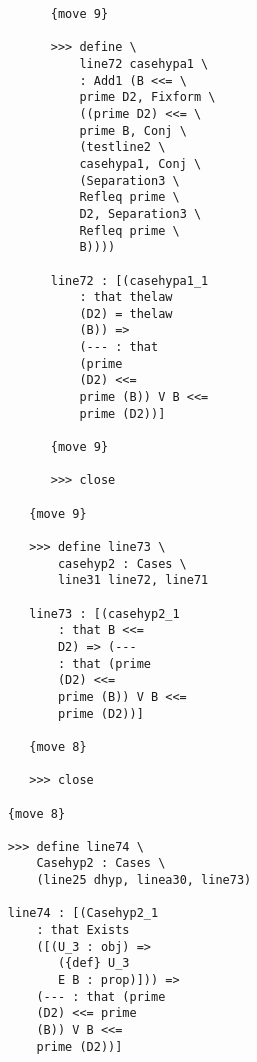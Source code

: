 \documentclass[12pt]{article}
\begin{document}
\begin{verbatim}
                              {move 9}

                              >>> define \
                                  line72 casehypa1 \
                                  : Add1 (B <<= \
                                  prime D2, Fixform \
                                  ((prime D2) <<= \
                                  prime B, Conj \
                                  (testline2 \
                                  casehypa1, Conj \
                                  (Separation3 \
                                  Refleq prime \
                                  D2, Separation3 \
                                  Refleq prime \
                                  B))))

                              line72 : [(casehypa1_1 
                                  : that thelaw 
                                  (D2) = thelaw 
                                  (B)) => 
                                  (--- : that 
                                  (prime 
                                  (D2) <<= 
                                  prime (B)) V B <<= 
                                  prime (D2))]

                              {move 9}

                              >>> close

                           {move 9}

                           >>> define line73 \
                               casehyp2 : Cases \
                               line31 line72, line71

                           line73 : [(casehyp2_1 
                               : that B <<= 
                               D2) => (--- 
                               : that (prime 
                               (D2) <<= 
                               prime (B)) V B <<= 
                               prime (D2))]

                           {move 8}

                           >>> close

                        {move 8}

                        >>> define line74 \
                            Casehyp2 : Cases \
                            (line25 dhyp, linea30, line73)

                        line74 : [(Casehyp2_1 
                            : that Exists 
                            ([(U_3 : obj) => 
                               ({def} U_3 
                               E B : prop)])) => 
                            (--- : that (prime 
                            (D2) <<= prime 
                            (B)) V B <<= 
                            prime (D2))]


\end{verbatim}
\end{document}
